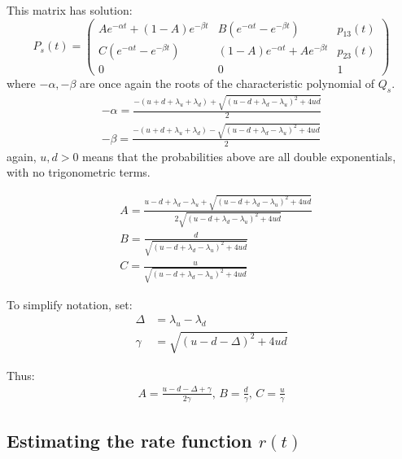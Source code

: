 This matrix has solution:
\begin{equation}
P_s(t) =
\begin{pmatrix}
Ae^{-\alpha t} + (1-A)e^{-\beta t} & B\left(e^{-\alpha t} - e^{-\beta t}\right) & p_{13}(t) \\
C\left(e^{-\alpha t} - e^{-\beta t}\right) & (1-A)e^{-\alpha t} + Ae^{-\beta t} & p_{23}(t)\\
0 & 0 & 1
\end{pmatrix}
\end{equation}
where $-\alpha,-\beta$ are once again the roots of the characteristic polynomial of $Q_s$.
\begin{equation}
\begin{split}
-\alpha = \frac{-(u+d+\lambda_u+\lambda_d) + \sqrt{(u-d+\lambda_d-\lambda_u)^2+4ud}}{2}\\
-\beta = \frac{-(u+d+\lambda_u+\lambda_d) - \sqrt{(u-d+\lambda_d-\lambda_u)^2+4ud}}{2}
\end{split}
\end{equation}
again, $u,d>0$ means that the probabilities above are all double exponentials, with no trigonometric terms.

\begin{equation}
\begin{split}
& A = \frac{u-d+\lambda_d-\lambda_u + \sqrt{(u-d+\lambda_d-\lambda_u)^2+4ud}}{2\sqrt{(u-d+\lambda_d-\lambda_u)^2 + 4ud}}\\
& B = \frac{d}{\sqrt{(u-d+\lambda_d-\lambda_u)^2 + 4ud}}\\
& C = \frac{u}{\sqrt{(u-d+\lambda_d-\lambda_u)^2 + 4ud}}
\end{split}
\end{equation}

To simplify notation, set:
\begin{equation}
\begin{split}
\label{dg}
\Delta &= \lambda_u - \lambda_d\\
\gamma &= \sqrt{(u-d-\Delta)^2 + 4ud}
\end{split}
\end{equation}

Thus:
\begin{equation}
\begin{split}
A = \frac{u-d - \Delta + \gamma}{2\gamma},\, B = \frac{d}{\gamma}, \,C = \frac{u}{\gamma}
\end{split}
\end{equation}

\subsection{Estimating the rate function $r(t)$}

